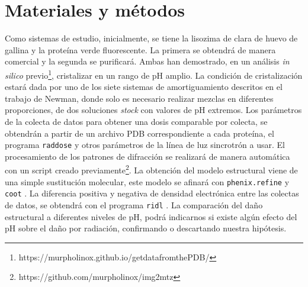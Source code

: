 \documentclass[11pt,letterpaper]{article}
\begin{document}
	\section{Materiales y métodos}
	Como sistemas de estudio, inicialmente, se tiene la lisozima de clara de huevo de gallina y la proteína verde fluorescente. La primera se obtendrá de manera comercial y la segunda se purificará. Ambas han demostrado, en un análisis \emph{in silico} previo\footnote{https://murpholinox.github.io/getdatafromthePDB/}, cristalizar en un rango de pH amplio. La condición de cristalización estará dada por uno de los siete sistemas de amortiguamiento descritos en el trabajo de Newman\cite{Newman2004}, donde solo es necesario realizar mezclas en diferentes proporciones, de dos soluciones \emph{stock} con valores de pH extremos. 
	Los parámetros de la colecta de datos para obtener una dosis comparable por colecta, se obtendrán a partir de un archivo PDB correspondiente a cada proteína, el programa \verb|raddose| \cite{Bury2018} y otros parámetros de la línea de luz sincrotrón a usar. El procesamiento de los patrones de difracción se realizará de manera automática con un script creado previamente\footnote{https://github.com/murpholinox/img2mtz}. La obtención del modelo estructural viene de una simple sustitución molecular, este modelo se afinará con \verb|phenix.refine| y \verb|coot| \cite{Liebschner2019,Emsley2010}. La diferencia positiva y negativa de densidad electrónica entre las colectas de datos, se obtendrá con el programa \verb|ridl| \cite{Bury2018a}. La comparación del daño estructural a diferentes niveles de pH, podrá indicarnos si existe algún efecto del pH sobre el daño por radiación, confirmando o descartando nuestra hipótesis. 
	
	
	
\end{document}
